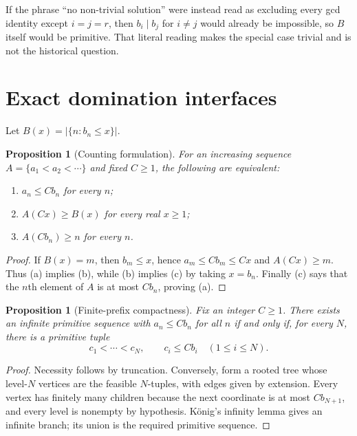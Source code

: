 \documentclass[11pt]{article}
\newtheorem{proposition}[theorem]{Proposition}
\theoremstyle{definition}
\theoremstyle{remark}
\newcommand{\card}[1]{\lvert #1\rvert}
\begin{document}
If the phrase ``no non-trivial solution'' were instead read as excluding every gcd
identity except $i=j=r$, then $b_i\mid b_j$ for $i\ne j$ would already be impossible,
so $B$ itself would be primitive.  That literal reading makes the special case trivial
and is not the historical question.

\section{Exact domination interfaces}

Let $B(x)=\card{\{n:b_n\le x\}}$.

\begin{proposition}[Counting formulation]\label{prop:counting}
For an increasing sequence $A=\{a_1<a_2<\cdots\}$ and fixed $C\ge1$, the following
are equivalent:
\begin{enumerate}[label=(\alph*)]
\item $a_n\le Cb_n$ for every $n$;
\item $A(Cx)\ge B(x)$ for every real $x\ge1$;
\item $A(Cb_n)\ge n$ for every $n$.
\end{enumerate}
\end{proposition}

\begin{proof}
If $B(x)=m$, then $b_m\le x$, hence $a_m\le Cb_m\le Cx$ and $A(Cx)\ge m$.
Thus (a) implies (b), while (b) implies (c) by taking $x=b_n$.  Finally (c) says that
the $n$th element of $A$ is at most $Cb_n$, proving (a).
\end{proof}

\begin{proposition}[Finite-prefix compactness]\label{prop:compactness}
Fix an integer $C\ge1$.  There exists an infinite primitive sequence with
$a_n\le Cb_n$ for all $n$ if and only if, for every $N$, there is a primitive tuple
\[
  c_1<\cdots<c_N,\qquad c_i\le Cb_i\quad(1\le i\le N).
\]
\end{proposition}

\begin{proof}
Necessity follows by truncation.  Conversely, form a rooted tree whose level-$N$
vertices are the feasible $N$-tuples, with edges given by extension.  Every vertex has
finitely many children because the next coordinate is at most $Cb_{N+1}$, and every
level is nonempty by hypothesis.  K\"onig's infinity lemma gives an infinite branch;
its union is the required primitive sequence.
\end{proof}
\end{document}
